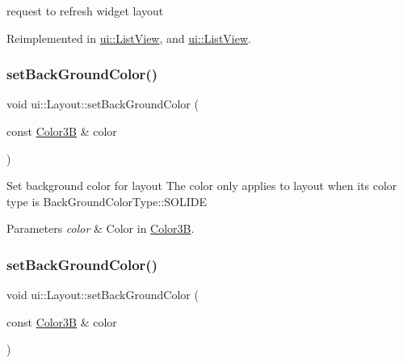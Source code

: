 request to refresh widget layout 

Reimplemented in \hyperlink{classui_1_1ListView_ab559aec6b481480fad169f2a53094028}{ui\+::\+List\+View}, and \hyperlink{classui_1_1ListView_ad02cdf77d0d8f0dd2586b2bc083d4750}{ui\+::\+List\+View}.

\mbox{\label{classui_1_1Layout_af3c5819c00efadfa70ae258c4e44d2e5}} 
\subsubsection{\texorpdfstring{set\+Back\+Ground\+Color()}{setBackGroundColor()}\hspace{0.1cm}{\footnotesize\ttfamily [1/4]}}
{\footnotesize\ttfamily void ui\+::\+Layout\+::set\+Back\+Ground\+Color (\begin{DoxyParamCaption}\item[{const \hyperlink{structColor3B}{Color3B} \&}]{color }\end{DoxyParamCaption})}

Set background color for layout The color only applies to layout when it\textquotesingle{}s color type is Back\+Ground\+Color\+Type\+::\+S\+O\+L\+I\+DE


\begin{DoxyParams}{Parameters}
{\em color} & Color in \hyperlink{structColor3B}{Color3B}. \\
\hline
\end{DoxyParams}
\mbox{\label{classui_1_1Layout_af3c5819c00efadfa70ae258c4e44d2e5}} 
\subsubsection{\texorpdfstring{set\+Back\+Ground\+Color()}{setBackGroundColor()}\hspace{0.1cm}{\footnotesize\ttfamily [2/4]}}
{\footnotesize\ttfamily void ui\+::\+Layout\+::set\+Back\+Ground\+Color (\begin{DoxyParamCaption}\item[{const \hyperlink{structColor3B}{Color3B} \&}]{color }\end{DoxyParamCaption})}

